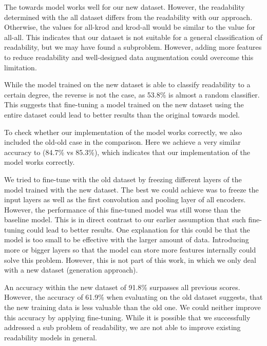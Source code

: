 \documentclass[%
class=scrreprt,
chapterprefix=false,%
open=right,%
twoside=false,%
paper=a4,%
logofile={Logo\_zentral\_farbig\_EN.png},%
thesistype=master,%
UKenglish,%
]{se2thesis}
\theoremstyle{definition}
\newenvironment{researchbox}[1]{\begin{tcolorbox}[colback=blue!10!white,colframe=blue!50!black,title=#1]}{\end{tcolorbox}}
\begin{document}
	The towards model works well for our new dataset. However, the readability determined with the all dataset differs from the readability with our approach. Otherwise, the values for all-krod and krod-all would be similar to the value for all-all. This indicates that our dataset is not suitable for a general classification of readability, but we may have found a subproblem. However, adding more features to reduce readability and well-designed data augmentation could overcome this limitation.
		
	While the model trained on the new dataset is able to classify readability to a certain degree, the reverse is not the case, as 53.8\% is almost a random classifier. This suggests that fine-tuning a model trained on the new dataset using the entire dataset could lead to better results than the original towards model.
	
	To check whether our implementation of the model works correctly, we also included the old-old case in the comparison. Here we achieve a very similar accuracy to \citeauthor{mi2022towards} (84.7\% vs 85.3\%), which indicates that our implementation of the model works correctly.
	
	We tried to fine-tune with the old dataset by freezing different layers of the model trained with the new dataset. The best we could achieve was to freeze the input layers as well as the first convolution and pooling layer of all encoders. However, the performance of this fine-tuned model was still worse than the baseline model. This is in direct contrast to our earlier assumption that such fine-tuning could lead to better results. One explanation for this could be that the model is too small to be effective with the larger amount of data. Introducing more or bigger layers so that the model can store more features internally could solve this problem. However, this is not part of this work, in which we only deal with a new dataset (generation approach).
	
	\begin{researchbox}{Summary (RQ3 - new-data):}
		An accuracy within the new dataset of 91.8\% surpasses all previous scores. However, the accuracy of 61.9\% when evaluating on the old dataset suggests, that the new training data is less valuable than the old one. We could neither improve this accuracy by applying fine-tuning. While it is possible that we successfully addressed a sub problem of readability, we are not able to improve existing readability models in general.
	\end{researchbox}
	
\end{document}
